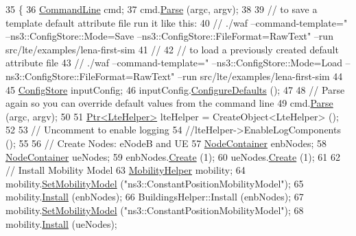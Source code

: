 \begin{DoxyCode}
35 \{       
36   \hyperlink{classns3_1_1CommandLine}{CommandLine} cmd;
37   cmd.\hyperlink{classns3_1_1CommandLine_a5c10b85b3207e5ecb48d907966923156}{Parse} (argc, argv);
38         
39   \textcolor{comment}{// to save a template default attribute file run it like this:}
40   \textcolor{comment}{// ./waf --command-template="%
       --ns3::ConfigStore::Mode=Save --ns3::ConfigStore::FileFormat=RawText" --run src/lte/examples/lena-first-sim}
41   \textcolor{comment}{//}
42   \textcolor{comment}{// to load a previously created default attribute file}
43   \textcolor{comment}{// ./waf --command-template="%
       --ns3::ConfigStore::Mode=Load --ns3::ConfigStore::FileFormat=RawText" --run src/lte/examples/lena-first-sim}
44 
45   \hyperlink{classns3_1_1ConfigStore}{ConfigStore} inputConfig;
46   inputConfig.\hyperlink{classns3_1_1ConfigStore_a0a6137574d7c847c3823af8b9d1bb886}{ConfigureDefaults} ();
47 
48   \textcolor{comment}{// Parse again so you can override default values from the command line}
49   cmd.\hyperlink{classns3_1_1CommandLine_a5c10b85b3207e5ecb48d907966923156}{Parse} (argc, argv);
50 
51   \hyperlink{classns3_1_1Ptr}{Ptr<LteHelper>} lteHelper = CreateObject<LteHelper> ();
52 
53   \textcolor{comment}{// Uncomment to enable logging}
54   \textcolor{comment}{//lteHelper->EnableLogComponents ();}
55 
56   \textcolor{comment}{// Create Nodes: eNodeB and UE}
57   \hyperlink{classns3_1_1NodeContainer}{NodeContainer} enbNodes;
58   \hyperlink{classns3_1_1NodeContainer}{NodeContainer} ueNodes;
59   enbNodes.\hyperlink{classns3_1_1NodeContainer_a787f059e2813e8b951cc6914d11dfe69}{Create} (1);
60   ueNodes.\hyperlink{classns3_1_1NodeContainer_a787f059e2813e8b951cc6914d11dfe69}{Create} (1);
61 
62   \textcolor{comment}{// Install Mobility Model}
63   \hyperlink{classns3_1_1MobilityHelper}{MobilityHelper} mobility;
64   mobility.\hyperlink{classns3_1_1MobilityHelper_a030275011b6f40682e70534d30280aba}{SetMobilityModel} (\textcolor{stringliteral}{"ns3::ConstantPositionMobilityModel"});
65   mobility.\hyperlink{classns3_1_1MobilityHelper_a07737960ee95c0777109cf2994dd97ae}{Install} (enbNodes);
66   BuildingsHelper::Install (enbNodes);
67   mobility.\hyperlink{classns3_1_1MobilityHelper_a030275011b6f40682e70534d30280aba}{SetMobilityModel} (\textcolor{stringliteral}{"ns3::ConstantPositionMobilityModel"});
68   mobility.\hyperlink{classns3_1_1MobilityHelper_a07737960ee95c0777109cf2994dd97ae}{Install} (ueNodes);

\end{DoxyCode}
